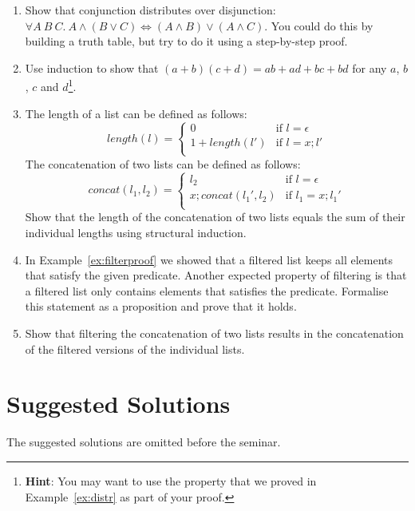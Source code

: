 \documentclass{tufte-handout}
\newcounter{theExerciseCounter}
\begin{document}
\begin{enumerate}
\setcounter{enumi}{\value{theExerciseCounter}}
\item Show that conjunction distributes over disjunction:\\
  $\forall A~B~C. ~A \land (B \lor C) \iff (A \land B) \lor (A
  \land C)$. You could do this by building a truth table, but try
  to do it using a step-by-step proof.
\item Use induction to show that
  $(a + b)(c + d) = ab + ad + bc + bd$ for any $a$, $b$, $c$ and
  $d$\footnote{\textbf{Hint}: You may want to use the property
    that we proved in Example~\ref{ex:distr} as part of your
    proof.}.
\item The length of a list can be defined as follows:
  \[
  \mathit{length}(l) =
  \begin{cases}
    0 & \text{if } l = \epsilon\\
    1 + \mathit{length}(l')& \text{if } l = x; l'\\
  \end{cases}
  \]
  The concatenation of two lists can be defined as follows:
  \[
  \mathit{concat}(l_1, l_2) =
  \begin{cases}
    l_2 & \text{if } l = \epsilon\\
    x; \mathit{concat}(l_1', l_2) & \text{if } l_1 = x; l_1'\\
  \end{cases}
  \]
  Show that the length of the concatenation of two lists equals
  the sum of their individual lengths using structural induction.
\item In Example~\ref{ex:filterproof} we showed that a filtered
  list keeps all elements that satisfy the given predicate.
  Another expected property of filtering is that a filtered list
  only contains elements that satisfies the predicate. Formalise
  this statement as a proposition and prove that it holds.
\item Show that filtering the concatenation of two lists results
  in the concatenation of the filtered versions of the individual
  lists.
\end{enumerate}



\section{Suggested Solutions}

The suggested solutions are omitted before the seminar.
\end{document}
